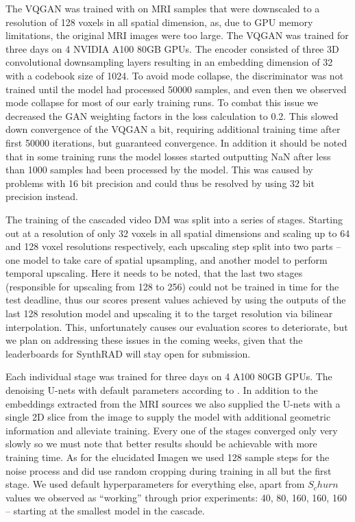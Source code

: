 \documentclass{article}
\begin{document}
The VQGAN was trained with on MRI samples that were downscaled to a resolution of 128 voxels in all spatial dimension, as, due to GPU memory limitations, the original MRI images were too large. 
The VQGAN was trained for three days on 4 NVIDIA A100 80GB GPUs. The encoder consisted of three 3D convolutional downsampling layers resulting in an embedding dimension of 32 with a codebook size of 1024. To avoid mode collapse, the discriminator was not trained until the model had processed 50000 samples, and even then we observed mode collapse for most of our early training runs. To combat this issue we decreased the GAN weighting factors in the loss calculation to 0.2. This slowed down convergence of the VQGAN a bit, requiring additional training time after first 50000 iterations, but guaranteed convergence. In addition it should be noted that in some training runs the model losses started outputting NaN after less than 1000 samples had been processed by the model. This was caused by problems with 16 bit precision and could thus be resolved by using 32 bit precision instead. 

The training of the cascaded video DM was split into a series of stages. Starting out at a resolution of only 32 voxels in all spatial dimensions and scaling up to 64 and 128 voxel resolutions respectively, each upscaling step split into two parts -- one model to take care of spatial upsampling, and another model to perform temporal upscaling. Here it needs to be noted, that the last two stages (responsible for upscaling from 128 to 256) could not be trained in time for the test deadline, thus our scores present values achieved by using the outputs of the last 128 resolution model and upscaling it to the target resolution via bilinear interpolation. This, unfortunately causes our evaluation scores to deteriorate, but we plan on addressing these issues in the coming weeks, given that the leaderboards for SynthRAD will stay open for submission. 

Each individual stage was trained for three days on 4 A100 80GB GPUs. The denoising U-nets with default parameters according to \cite{reynaud2023featureconditioned}. In addition to the embeddings extracted from the MRI sources we also supplied the U-nets with a single 2D slice from the image to supply the model with additional geometric information and alleviate training. Every one of the stages converged only very slowly so we must note that better results should be achievable with more training time. As for the elucidated Imagen we used 128 sample steps for the noise process and did use random cropping during training in all but the first stage. We used default hyperparameters for everything else, apart from $S_churn$ values we observed as ``working'' through prior experiments: 40, 80, 160, 160, 160 -- starting at the smallest model in the cascade.
\end{document}
